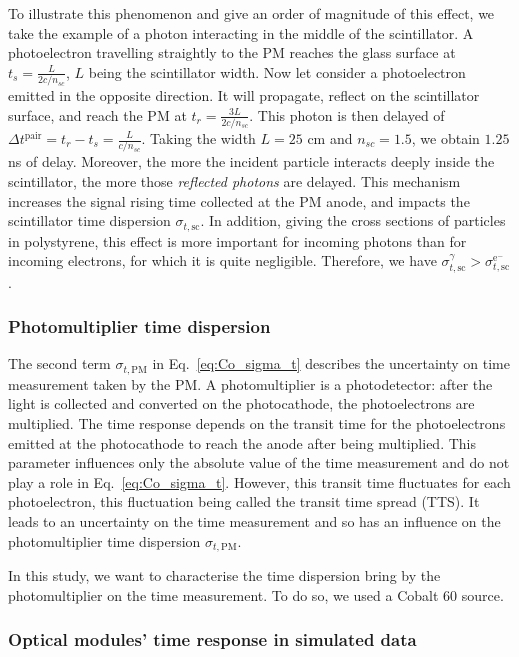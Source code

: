 To illustrate this phenomenon and give an order of magnitude of this effect, we take the example of a photon interacting in the middle of the scintillator.
A photoelectron travelling straightly to the PM reaches the glass surface at $t_{s} = \frac{L}{2c/n_{sc}}$, $L$ being the scintillator width.
Now let consider a photoelectron emitted in the opposite direction.
It will propagate, reflect on the scintillator surface, and reach the PM at $t_{r} = \frac{3L}{2c/n_{sc}}$.
This photon is then delayed of $\Delta t^{\text{pair}} = t_{r} - t_{s} = \frac{L}{c/n_{sc}}$.
Taking the width $L=25$ cm and $n_{sc}=1.5$, we obtain $1.25$ ns of delay.
Moreover, the more the incident particle interacts deeply inside the scintillator, the more those \emph{reflected photons} are delayed.
This mechanism increases the signal rising time collected at the PM anode, and impacts the scintillator time dispersion $\sigma_{t,\text{sc}}$.
In addition, giving the cross sections of particles in polystyrene, this effect is more important for incoming photons than for incoming electrons, for which it is quite negligible.
Therefore, we have $\sigma_{t,\text{sc}}^{\gamma}>\sigma_{t,\text{sc}}^{\text{e}^{-}}$.


\subsubsection*{Photomultiplier time dispersion}

The second term $\sigma_{t,\text{PM}}$ in Eq.~\eqref{eq:Co_sigma_t} describes the uncertainty on time measurement taken by the PM.
A photomultiplier is a photodetector: after the light is collected and converted on the photocathode, the photoelectrons are multiplied.
The time response depends on the transit time for the photoelectrons emitted at the photocathode to reach the anode after being multiplied.
This parameter influences only the absolute value of the time measurement and do not play a role in Eq.~\eqref{eq:Co_sigma_t}.
However, this transit time fluctuates for each photoelectron, this fluctuation being called the transit time spread (TTS).
It leads to an uncertainty on the time measurement and so has an influence on the photomultiplier time dispersion $\sigma_{t,\text{PM}}$.
\newline

In this study, we want to characterise the time dispersion bring by the photomultiplier on the time measurement.
To do so, we used a Cobalt $60$ source.

\subsubsection*{Optical modules' time response in simulated data}

